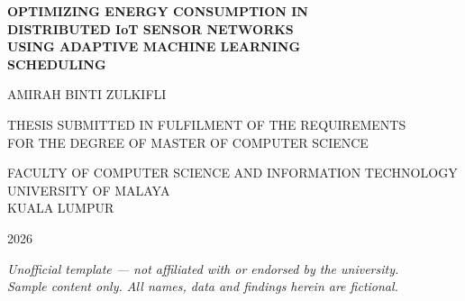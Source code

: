 \documentclass[12pt,a4paper]{report}
\begin{document}
\newpage
\thispagestyle{empty}
\begin{center}
\vspace*{0.6cm}
{\Large\bfseries\color{ummaroon}
OPTIMIZING ENERGY CONSUMPTION IN\\[4pt]
DISTRIBUTED IoT SENSOR NETWORKS\\[4pt]
USING ADAPTIVE MACHINE LEARNING\\[4pt]
SCHEDULING
}

\vspace{2.0cm}
{\large\color{umslate} AMIRAH BINTI ZULKIFLI}

\vspace{2.0cm}
{\normalsize\color{umslate}
\parbox{11cm}{\centering
THESIS SUBMITTED IN FULFILMENT OF THE REQUIREMENTS\\
FOR THE DEGREE OF MASTER OF COMPUTER SCIENCE
}}

\vspace{2.0cm}
{\normalsize\color{umslate}
FACULTY OF COMPUTER SCIENCE AND INFORMATION TECHNOLOGY\\
UNIVERSITY OF MALAYA\\
KUALA LUMPUR
}

\vspace{1.4cm}
{\normalsize\color{umslate} 2026}
\end{center}

\vfill
\begin{center}
\footnotesize\color{umslate!70}
\textit{Unofficial template --- not affiliated with or endorsed by the university.\\
Sample content only. All names, data and findings herein are fictional.}
\end{center}






























\end{document}
